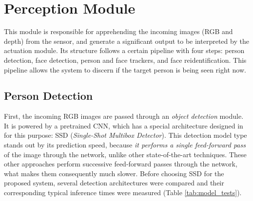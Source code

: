 \section{Perception Module}

This module is responsible for apprehending the incoming images (RGB and depth) from the sensor, and generate a significant output to be interpreted by the actuation module. Its structure follows a certain pipeline with four steps: person detection, face detection, person and face trackers, and face reidentification. This pipeline allows the system to discern if the target person is being seen right now. 

\subsection{Person Detection}

First, the incoming RGB images are passed through an \emph{object detection} module. It is powered by a pretrained CNN, which has a special architecture designed in \cite{ssd} for this purpose: SSD (\emph{Single-Shot Multibox Detector}). This detection model type stands out by its prediction speed, because \emph{it performs a single feed-forward pass} of the image through the network, unlike other state-of-the-art techniques. These other approaches perform successive feed-forward passes through the network, what makes them consequently much slower. Before choosing SSD for the proposed system, several detection architectures were compared and their corresponding typical inference times were measured (Table \ref{tab:model_tests}).

